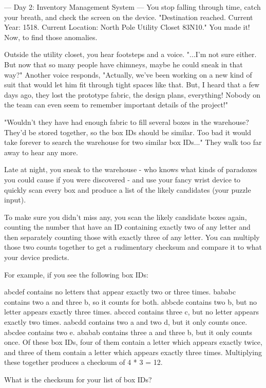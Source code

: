 --- Day 2: Inventory Management System ---
You stop falling through time, catch your breath, and check the screen on the device. "Destination reached. Current Year: 1518. Current Location: North Pole Utility Closet 83N10." You made it! Now, to find those anomalies.

Outside the utility closet, you hear footsteps and a voice. "...I'm not sure either. But now that so many people have chimneys, maybe he could sneak in that way?" Another voice responds, "Actually, we've been working on a new kind of suit that would let him fit through tight spaces like that. But, I heard that a few days ago, they lost the prototype fabric, the design plans, everything! Nobody on the team can even seem to remember important details of the project!"

"Wouldn't they have had enough fabric to fill several boxes in the warehouse? They'd be stored together, so the box IDs should be similar. Too bad it would take forever to search the warehouse for two similar box IDs..." They walk too far away to hear any more.

Late at night, you sneak to the warehouse - who knows what kinds of paradoxes you could cause if you were discovered - and use your fancy wrist device to quickly scan every box and produce a list of the likely candidates (your puzzle input).

To make sure you didn't miss any, you scan the likely candidate boxes again, counting the number that have an ID containing exactly two of any letter and then separately counting those with exactly three of any letter. You can multiply those two counts together to get a rudimentary checksum and compare it to what your device predicts.

For example, if you see the following box IDs:

abcdef contains no letters that appear exactly two or three times.
bababc contains two a and three b, so it counts for both.
abbcde contains two b, but no letter appears exactly three times.
abcccd contains three c, but no letter appears exactly two times.
aabcdd contains two a and two d, but it only counts once.
abcdee contains two e.
ababab contains three a and three b, but it only counts once.
Of these box IDs, four of them contain a letter which appears exactly twice, and three of them contain a letter which appears exactly three times. Multiplying these together produces a checksum of 4 * 3 = 12.

What is the checksum for your list of box IDs?

